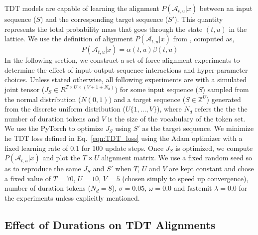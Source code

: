 \documentclass{article}
\begin{document}
TDT models are capable of learning the alignment $P(\mathcal{A}_{t, u} | x)$ between an input sequence ($S$) and the corresponding target sequence ($S'$). This quantity represents the total probability mass that goes through the state $(t, u)$ in the lattice.
We use the definition of alignment $P(\mathcal{A}_{t, u} | x)$ from \cite{yu2021fastemit},  computed as,
\begin{equation}
    P(\mathcal{A}_{t, u} | x) = \alpha(t, u) \beta(t, u)
\end{equation}
In the following section, we construct a set of force-alignment experiments to determine the effect of input-output sequence interactions and hyper-parameter choices. 
Unless stated otherwise, all following experiments are with a simulated joint tensor ($J_S \in R^{T \times U \times (V + 1 + N_d)}$) for some input sequence ($S$) sampled from the normal distribution ($N(0, 1)$) and a target sequence ($S \in \mathbb{Z}^{U}$) generated from the discrete uniform distribution ($U\{1, \ldots, V \}$), where $N_d$ refers the the the number of duration tokens and $V$ is the size of the vocabulary of the token set. We use the PyTorch  \cite{paszke_pytorch} to optimize $J_S$ using $S'$ as the target sequence. 
We minimize he TDT loss defined in Eq.~\ref{eqn:TDT_loss} using the Adam optimizer \cite{kingma_adam} with 
a fixed learning rate of 0.1 
for 100 update steps. Once $J_S$ is optimized, we compute 
 $P(\mathcal{A}_{t, u} | x)$ and plot the $T \times U$ alignment matrix. We use a fixed random seed so as to reproduce the same $J_S$ and $S'$ when $T$, $U$ and $V$ are kept constant and chose a fixed value of $T = 70$, $U = 10$, $V = 5$ (chosen simply to speed up convergence), number of duration tokens ($N_d = 8$), $\sigma = 0.05$, $\omega = 0.0$ and $\text{fastemit } \lambda = 0.0$ for the experiments unless explicitly mentioned. 

\subsection{Effect of Durations on TDT Alignments}
\label{sec:durations_tdt}
\end{document}
